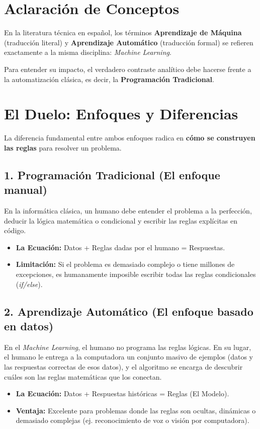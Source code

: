 \section{Aclaración de Conceptos}
En la literatura técnica en español, los términos \textbf{Aprendizaje de Máquina} (traducción literal) y \textbf{Aprendizaje Automático} (traducción formal) se refieren exactamente a la misma disciplina: \textit{Machine Learning}.

Para entender su impacto, el verdadero contraste analítico debe hacerse frente a la automatización clásica, es decir, la \textbf{Programación Tradicional}.

\section{El Duelo: Enfoques y Diferencias}

La diferencia fundamental entre ambos enfoques radica en \textbf{cómo se construyen las reglas} para resolver un problema.

\subsection{1. Programación Tradicional (El enfoque manual)}
En la informática clásica, un humano debe entender el problema a la perfección, deducir la lógica matemática o condicional y escribir las reglas explícitas en código.
\begin{itemize}
    \item \textbf{La Ecuación:} Datos + Reglas dadas por el humano = Respuestas.
    \item \textbf{Limitación:} Si el problema es demasiado complejo o tiene millones de excepciones, es humanamente imposible escribir todas las reglas condicionales (\textit{if/else}).
\end{itemize}

\subsection{2. Aprendizaje Automático (El enfoque basado en datos)}
En el \textit{Machine Learning}, el humano no programa las reglas lógicas. En su lugar, el humano le entrega a la computadora un conjunto masivo de ejemplos (datos y las respuestas correctas de esos datos), y el algoritmo se encarga de descubrir cuáles son las reglas matemáticas que los conectan.
\begin{itemize}
    \item \textbf{La Ecuación:} Datos + Respuestas históricas = Reglas (El Modelo).
    \item \textbf{Ventaja:} Excelente para problemas donde las reglas son ocultas, dinámicas o demasiado complejas (ej. reconocimiento de voz o visión por computadora).
\end{itemize}

